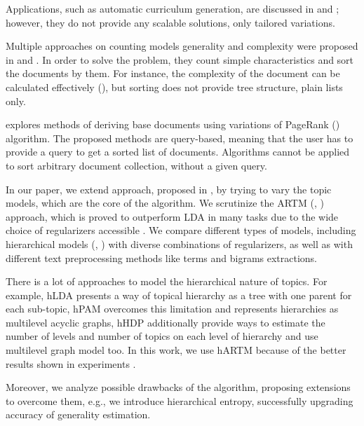 \documentclass[12pt,twoside]{article}
\begin{document}
    Applications, such as automatic curriculum generation, are discussed in \cite{kisla13course} and \cite{pirrone05learning}; however, they do not provide any scalable solutions, only tailored variations. 
    
    Multiple approaches on counting models generality and complexity were proposed in \cite{eremeev19ranlp} and \cite{solovyev18assessment}. In order to solve the problem, they count simple characteristics and sort the documents by them. For instance, the complexity of the document can be calculated effectively (\cite{eremeev19ranlp}), but sorting does not provide tree structure, plain lists only.
    
    \cite{jardine14automatically} explores methods of deriving base documents using variations of PageRank (\cite{dode17textrank}) algorithm. The proposed methods are query-based, meaning that the user has to provide a query to get a sorted list of documents. Algorithms cannot be applied to sort arbitrary document collection, without a given query. 
    
    In our paper, we extend approach, proposed in \cite{conf/icde/KoutrikaLS15}, by trying to vary the topic models, which are the core of the algorithm. We scrutinize the ARTM (\cite{vorontsov2015additive}, \cite{vorontsov2015bigartm}) approach, which is proved to outperform LDA \cite{blei10lda} in many tasks due to the wide choice of regularizers accessible \cite{voron15mlj}. We compare different types of models, including hierarchical models (\cite{chirkova16hier}, \cite{journals/corr/abs-1811-02820}) with diverse combinations of regularizers, as well as with different text preprocessing methods like terms and bigrams extractions. 
    
    There is a lot of approaches to model the hierarchical nature of topics. For example, hLDA \cite{journals/jacm/BleiGJ10} presents a way of topical hierarchy as a tree with one parent for each sub-topic, hPAM \cite{oai:works.bepress.com:andrew_mccallum-1189} overcomes this limitation and represents hierarchies as multilevel acyclic graphs, hHDP \cite{journals/jmlr/ZavitsanosPV11} additionally provide ways to estimate the number of levels and number of topics on each level of hierarchy and use multilevel graph model too. In this work, we use hARTM because of the better results shown in experiments \cite{journals/corr/abs-1811-02820}.
    
    Moreover, we analyze possible drawbacks of the algorithm, proposing extensions to overcome them, e.g., we introduce hierarchical entropy, successfully upgrading accuracy of generality estimation.
    
\end{document}
